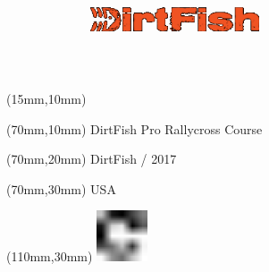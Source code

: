 \null\newpage
\begin{textblock*}{50mm}(15mm,10mm)%
\includegraphics[width=50mm]{LG/DIR.png}
\end{textblock*}
\begin{textblock*}{130mm}(70mm,10mm)%
{\fontsize{20}{20}\selectfont DirtFish Pro Rallycross Course}\\
\end{textblock*}
\begin{textblock*}{120mm}(70mm,20mm)%
{\fontsize{16}{16}\selectfont DirtFish / 2017}\\
\end{textblock*}
\begin{textblock*}{120mm}(70mm,30mm)%
{\fontsize{12}{12}\selectfont USA}
\end{textblock*}
\begin{textblock*}{30mm}(110mm,30mm)%
\centering
\includegraphics[height=15mm]{icons/fa-rotate-right.pdf}
\end{textblock*}
